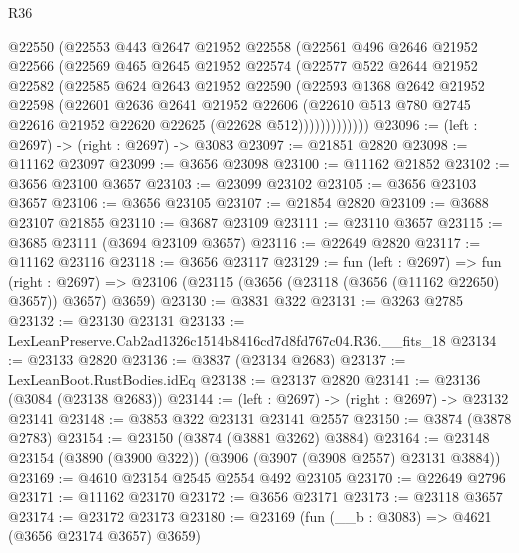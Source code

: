 \begin{lexlean}{R36}
\begin{coremodule}
            @22550
            (@22553
              @443
              @2647
              @21952
              @22558
              (@22561
                @496
                @2646
                @21952
                @22566
                (@22569
                  @465
                  @2645
                  @21952
                  @22574
                  (@22577
                    @522
                    @2644
                    @21952
                    @22582
                    (@22585
                      @624
                      @2643
                      @21952
                      @22590
                      (@22593
                        @1368
                        @2642
                        @21952
                        @22598
                        (@22601
                          @2636
                          @2641
                          @21952
                          @22606
                          (@22610
                            @513
                            @780
                            @2745
                            @22616
                            @21952
                            @22620
                            @22625
                            (@22628 @512)))))))))))))
@23096 := (left : @2697) -> (right : @2697) -> @3083
@23097 := @21851 @2820
@23098 := @11162 @23097
@23099 := @3656 @23098
@23100 := @11162 @21852
@23102 := @3656 @23100 @3657
@23103 := @23099 @23102
@23105 := @3656 @23103 @3657
@23106 := @3656 @23105
@23107 := @21854 @2820
@23109 := @3688 @23107 @21855
@23110 := @3687 @23109
@23111 := @23110 @3657
@23115 := @3685 @23111 (@3694 @23109 @3657)
@23116 := @22649 @2820
@23117 := @11162 @23116
@23118 := @3656 @23117
@23129 := fun (left : @2697) =>
  fun (right : @2697) => @23106 (@23115 (@3656 (@23118 (@3656 (@11162 @22650) @3657)) @3657) @3659)
@23130 := @3831 @322
@23131 := @3263 @2785
@23132 := @23130 @23131
@23133 := LexLeanPreserve.Cab2ad1326c1514b8416cd7d8fd767c04.R36.__fits_18
@23134 := @23133 @2820
@23136 := @3837 (@23134 @2683)
@23137 := LexLeanBoot.RustBodies.idEq
@23138 := @23137 @2820
@23141 := @23136 (@3084 (@23138 @2683))
@23144 := (left : @2697) -> (right : @2697) -> @23132 @23141
@23148 := @3853 @322 @23131 @23141 @2557
@23150 := @3874 (@3878 @2783)
@23154 := @23150 (@3874 (@3881 @3262) @3884)
@23164 := @23148 @23154 (@3890 (@3900 @322)) (@3906 (@3907 (@3908 @2557) @23131 @3884))
@23169 := @4610 @23154 @2545 @2554 @492 @23105
@23170 := @22649 @2796
@23171 := @11162 @23170
@23172 := @3656 @23171
@23173 := @23118 @3657
@23174 := @23172 @23173
@23180 := @23169 (fun (__b : @3083) => @4621 (@3656 @23174 @3657) @3659)

\end{coremodule}
\end{lexlean}
